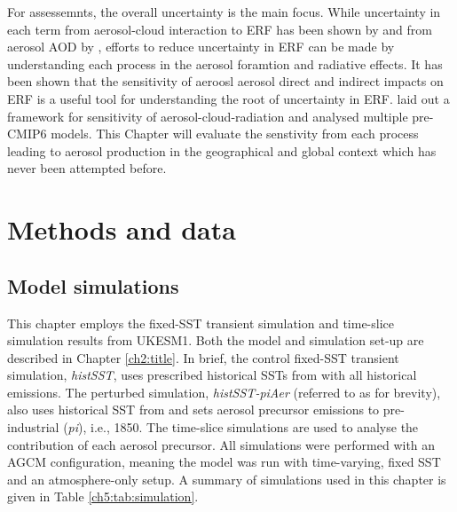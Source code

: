 For assessemnts, the overall uncertainty is the main focus. While uncertainty in each term from aerosol-cloud interaction to ERF has been shown by \citet{ghanChallengesConstrainingAnthropogenic2016} and from aerosol AOD by \citet{bellouinBoundingGlobalAerosol2020}, efforts to reduce uncertainty in ERF can be made by understanding each process in the aerosol foramtion and radiative effects. It has been shown that the sensitivity of aeroosl aerosol direct and indirect impacts on ERF is a useful tool for understanding the root of uncertainty in ERF. \citet{ghanChallengesConstrainingAnthropogenic2016} laid out a framework for sensitivity of aerosol-cloud-radiation and analysed multiple pre-CMIP6 models. This Chapter will evaluate the senstivity from each process leading to aerosol production in the geographical and global context which has never been attempted before.

\section{Methods and data}


\subsection{Model simulations}

This chapter employs the fixed-SST transient simulation and time-slice simulation results from UKESM1. Both the model and simulation set-up are described in Chapter \ref{ch2:title}. In brief, the control fixed-SST transient simulation, \textit{histSST}, uses prescribed historical SSTs from \hist{} with all historical emissions. The perturbed simulation, \textit{histSST-piAer} (referred to as \sstpiaer{} for brevity), also uses historical SST from \hist{} and sets aerosol precursor emissions to pre-industrial (\textit{pi}), i.e., 1850. The time-slice simulations are used to analyse the contribution of each aerosol precursor. All simulations were performed with an AGCM configuration, meaning the model was run with time-varying, fixed SST and an atmosphere-only setup. A summary of simulations used in this chapter is given in Table \ref{ch5:tab:simulation}. 

